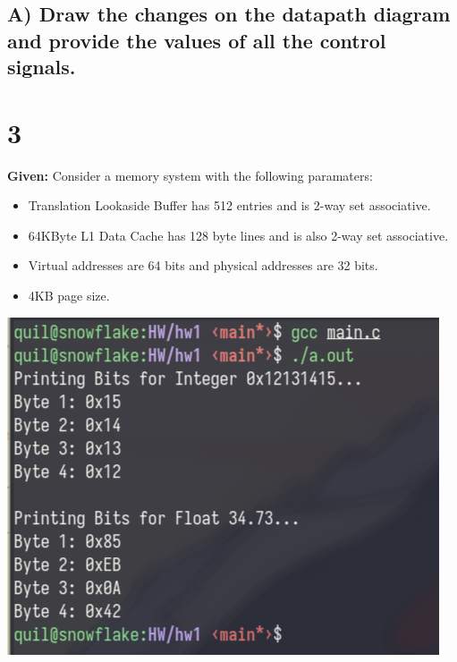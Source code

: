 \documentclass{article}
\begin{document}
\subsection{A) Draw the changes on the datapath diagram and provide the values of all the control signals.}

\section{3}
\textbf{Given:} Consider a memory system with the following paramaters:
\begin{itemize}
	\item Translation Lookaside Buffer has 512 entries and is 2-way set associative.
	\item 64KByte L1 Data Cache has 128 byte lines and is also 2-way set associative.
	\item Virtual addresses are 64 bits and physical addresses are 32 bits.
	\item 4KB page size.
\end{itemize}


\includegraphics[width=\textwidth]{evidence.png}
\newpage

\newpage
\end{document}
